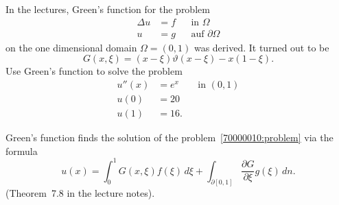 In the lectures, Green's function for the problem
\[
\begin{aligned}
\Delta u&= f & &\text{in $\Omega$}\\
       u&= g & &\text{auf $\partial\Omega$}
\end{aligned}
\]
on the one dimensional domain
$\Omega=(0,1)$ was derived.
It turned out to be
\[
G(x,\xi) = (x-\xi)\vartheta(x-\xi) -x(1-\xi).
\]
Use Green's function to solve the problem
\[
\begin{aligned}
u''(x)& = e^x& &\text{in $(0,1)$}\\
  u(0)& =  20& &\\
  u(1)& =  16.& &
\end{aligned}
\label{70000010:problem}
\]

\begin{loesung}
Green's function finds the solution of the problem~\eqref{70000010:problem}
via the formula
\begin{equation}
u(x)
=
\int_0^1 G(x,\xi) f(\xi)\,d\xi
+
\int_{\partial[0,1]}\frac{\partial G}{\partial \xi} g(\xi)\,dn.
\label{70000010:green}
\end{equation}
(Theorem~7.8 in the lecture notes). 


\end{loesung}
